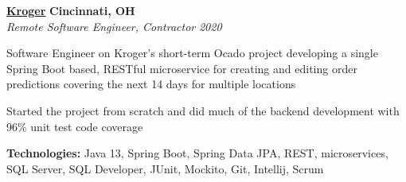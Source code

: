 %
    \headerrow
        {\textbf{\href{https://www.kroger.com/}{Kroger}}}
        {\textbf{Cincinnati, OH}}
    \\
    \headerrow
        {\emph{Remote Software Engineer, Contractor}}
        {\emph{2020}}
    \begin{itemize*}
        \item Software Engineer on Kroger's short-term Ocado project developing a single Spring Boot based, RESTful microservice for creating and editing
            order predictions covering the next 14 days for multiple locations
        \item Started the project from scratch and did much of the backend development with 96\% unit test code coverage
    \end{itemize*}

    \hspace{1.0em}
        {\textbf{Technologies:} Java 13, Spring Boot, Spring Data JPA, REST, microservices, SQL Server, SQL Developer, JUnit, Mockito,
            Git, Intellij, Scrum}

